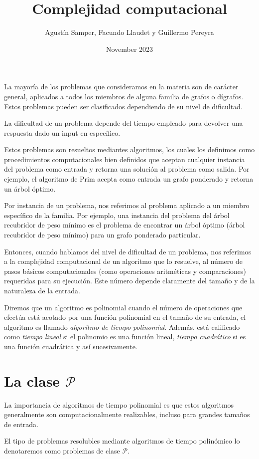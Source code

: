 \documentclass{article}
\title{Complejidad computacional}
\author{Agustín Samper, Facundo Llaudet y Guillermo Pereyra}
\date{November 2023}
\begin{document}
\maketitle
La mayoría de los problemas que consideramos en la materia son de 
carácter general, aplicados a todos los miembros de alguna familia de
grafos o dígrafos. Estos problemas pueden ser clasificados dependiendo de su nivel de dificultad.

La dificultad de un problema depende del tiempo empleado para
devolver una respuesta dado un input en específico.

Estos problemas son resueltos mediantes algoritmos, los cuales
los definimos como procedimientos computacionales bien definidos que 
aceptan cualquier instancia del problema como entrada y retorna una
solución al problema como salida. Por ejemplo,
el algoritmo de Prim acepta como entrada un grafo ponderado y retorna un
árbol óptimo.

Por instancia de un problema, nos referimos al
problema aplicado a un miembro específico de la familia. Por ejemplo,
una instancia del problema del árbol recubridor de peso mínimo es el
problema de encontrar un árbol óptimo (árbol recubridor de peso mínimo)
para un grafo ponderado particular.

Entonces, cuando hablamos del nivel de dificultad de un problema, nos
referimos a la complejidad computacional de un algoritmo que lo resuelve,
al número de pasos básicos computacionales (como operaciones aritméticas y comparaciones)
requeridas para su ejecución. Este número depende claramente del tamaño y de la 
naturaleza de la entrada.

Diremos que un algoritmo es polinomial cuando el número de
operaciones que efectúa está acotado por una función polinomial en
el tamaño de su entrada, el algoritmo es llamado \textit{algoritmo
de tiempo polinomial}. Además, está calificado como \textit{tiempo lineal}
si el polinomio es una función lineal, \textit{tiempo cuadrático} si 
es una función cuadrática y así sucesivamente.

\section*{La clase $\mathcal{P}$}
La importancia de algoritmos de tiempo polinomial es que estos algoritmos
generalmente son computacionalmente realizables, incluso para grandes
tamaños de entrada.

El tipo de problemas resolubles mediante algoritmos de tiempo polinómico
lo denotaremos como problemas de clase $\mathcal{P}$.
\end{document}

